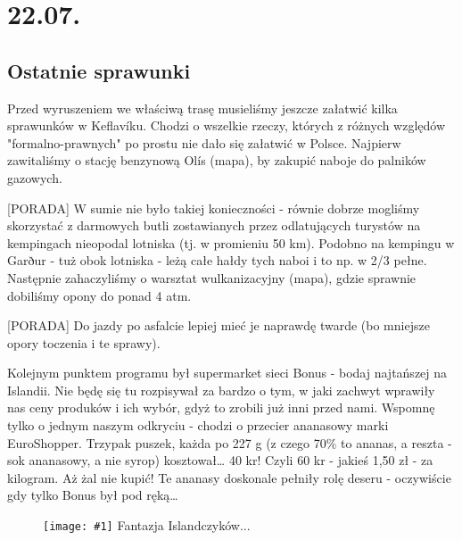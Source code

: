 \documentclass[12pt,a4paper,leqno]{book}
\newcommand{\hint}[1] {
	\vspace{6pt}
	[PORADA] #1
	\vspace{6pt}
}
\newcommand{\img}[3] {
	\begin{figure}[h]
		\centering
		\texttt{[image: \#1]}
		#3
		\label{img:#2}
	\end{figure}%
}
\begin{document}
\chapter{22.07.}

\section{Ostatnie sprawunki}

\indent Przed wyruszeniem we właściwą trasę musieliśmy jeszcze załatwić kilka sprawunków w Keflavíku. Chodzi o wszelkie rzeczy, których z różnych względów "formalno-prawnych" po prostu nie dało się załatwić w Polsce.
Najpierw zawitaliśmy o stację benzynową Olís (mapa), by zakupić naboje do palników gazowych.

\hint{W sumie nie było takiej konieczności - równie dobrze mogliśmy skorzystać z darmowych butli zostawianych przez odlatujących turystów na kempingach nieopodal lotniska (tj. w promieniu 50 km). Podobno na kempingu w Garður - tuż obok lotniska - leżą całe hałdy tych naboi i to np. w 2/3 pełne.
Następnie zahaczyliśmy o warsztat wulkanizacyjny (mapa), gdzie sprawnie dobiliśmy opony do ponad 4 atm.}

\hint{Do jazdy po asfalcie lepiej mieć je naprawdę twarde (bo mniejsze opory toczenia i te sprawy).}

Kolejnym punktem programu był supermarket sieci Bonus - bodaj najtańszej na Islandii. Nie będę się tu rozpisywał za bardzo o tym, w jaki zachwyt wprawiły nas ceny produków i ich wybór, gdyż to zrobili już inni przed nami. Wspomnę tylko o jednym naszym odkryciu - chodzi o przecier ananasowy marki EuroShopper. Trzypak puszek, każda po 227 g (z czego 70\% to ananas, a reszta - sok ananasowy, a nie syrop) kosztował… 40 kr! Czyli 60 kr - jakieś 1,50 zł - za kilogram. Aż żal nie kupić! Te ananasy doskonale pełniły rolę deseru - oczywiście gdy tylko Bonus był pod ręką…

\img{./photos/2014-07-22_14-53-31__2.jpg}{keflavik_metal_guys}{Fantazja Islandczyków...}





\end{document}
